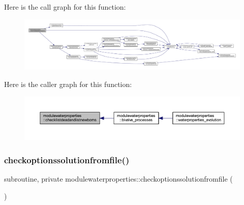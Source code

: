 Here is the call graph for this function\+:\nopagebreak
\begin{figure}[H]
\begin{center}
\leavevmode
\includegraphics[width=350pt]{namespacemodulewaterproperties_ab88c2923a48aacf7da60a45cfeb98dfc_cgraph}
\end{center}
\end{figure}
Here is the caller graph for this function\+:\nopagebreak
\begin{figure}[H]
\begin{center}
\leavevmode
\includegraphics[width=350pt]{namespacemodulewaterproperties_ab88c2923a48aacf7da60a45cfeb98dfc_icgraph}
\end{center}
\end{figure}
\mbox{\label{namespacemodulewaterproperties_a57c8ab92e75b6233d379f6d614bdd148}} 
\subsubsection{\texorpdfstring{checkoptionssolutionfromfile()}{checkoptionssolutionfromfile()}}
{\footnotesize\ttfamily subroutine, private modulewaterproperties\+::checkoptionssolutionfromfile (\begin{DoxyParamCaption}{ }\end{DoxyParamCaption})\hspace{0.3cm}{\ttfamily [private]}}

